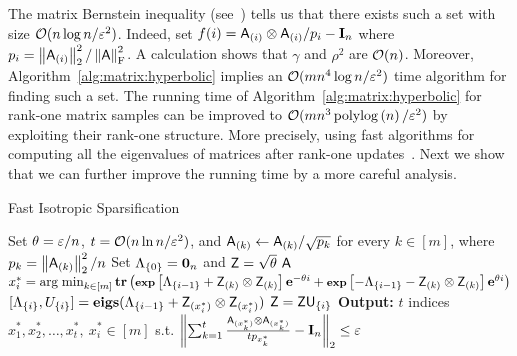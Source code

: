 %
The matrix Bernstein inequality (see~\cite{chernoff:matrix_valued:Tropp}) tells us that there exists such a set with size $\mathcal{O}(n\log n /\varepsilon^2)$. Indeed, set $f(i)={\mathsf{A} }_{(i)} \otimes {\ensuremath{\mathsf{A} }}_{(i)} / p_i - \mathbf{I}_n$ where $p_i = \left\|{\mathsf{A} }_{(i)}\right\|_2^2 / \left\|{\mathsf{A} }\right\|_{\textrm{F}}^2$. A calculation shows that $\gamma$ and $\rho^2$ are $\mathcal{O}(n)$. Moreover, Algorithm~\ref{alg:matrix:hyperbolic} implies an $\mathcal{O}(mn^4 \log n /\varepsilon^2)$ time algorithm for finding such a set. The running time of Algorithm~\ref{alg:matrix:hyperbolic} for rank-one matrix samples can be improved to $\mathcal{O}(mn^3 \operatorname{polylog}\left(n\right) /\varepsilon^2)$ by exploiting their rank-one structure. More precisely, using fast algorithms for computing all the eigenvalues of matrices after rank-one updates~\cite{Gu:update}. Next we show that we can further improve the running time by a more careful analysis.
%
%
%
\begin{algorithm}{}
	\caption{Fast Isotropic Sparsification}\label{alg:fast:isotrop}
\begin{algorithmic}[1]
 
\State Set $\theta = \varepsilon / n $, $t=\mathcal{O}( n \ln n/\varepsilon^2)$, and ${\mathsf{A} }_{(k)} \leftarrow {\ensuremath{\mathsf{A} }}_{(k)}/\sqrt{p_k}$ for every $k\in{[m]}$, where $p_k=\left\|{\mathsf{A} }_{(k)} \right\|_2^2/n$
\State Set $\Lambda_{\{0\}} = \mathbf{0}_n$ and ${\mathsf{Z} } = \sqrt{\theta}\ {\mathsf{A} }$
	\State $x_i^* = \operatorname*{arg\; min}_{k\in{[m]}}{\operatorname{\textbf{tr}}\left(\operatorname{\textbf{\footnotesize exp}}\left[ \Lambda_{\{i - 1\}} + {\mathsf{Z} }_{(k)} \otimes {\ensuremath{\mathsf{Z} }}_{(k)} \right]{\mathbf e}^{-\theta i}  + \operatorname{\textbf{\footnotesize exp}}\left[- \Lambda_{\{i - 1\}} - {\mathsf{Z} }_{(k)} \otimes {\ensuremath{\mathsf{Z} }}_{(k)} \right]{\mathbf e}^{\theta i}  \right)    } $ 
	\State $[\Lambda_{\{i\}}, U_{\{i\}}] = \textbf{eigs} ( \Lambda_{\{i - 1\}} + {\mathsf{Z} }_{(x_i^*)} \otimes {\ensuremath{\mathsf{Z} }}_{(x_i^*)} )$ 
	\State ${\mathsf{Z} } = {\mathsf{Z} }  {\mathsf{U} }_{\{i\}} $ 
\EndFor
\State \textbf{Output:} $t$ indices $x_1^*, x_2^*, \ldots ,x_t^*,\ x_i^* \in{[m]}$  s.t. $\left\| \sum_{k=1}^{t} \frac{ {\mathsf{A} }_{(x_k^*)} \otimes {\ensuremath{\mathsf{A} }}_{(x_k^*)} }{ tp_{x_k^*}} - \mathbf{I}_n \right\|_2 \leq \varepsilon $
\EndProcedure
\end{algorithmic}
\end{algorithm}
%

